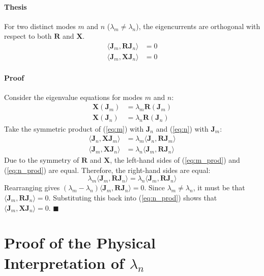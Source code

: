 \documentclass{article}
\begin{document}
\paragraph{Thesis} For two distinct modes $m$ and $n$ ($\lambda_m \neq \lambda_n$), the eigencurrents are orthogonal with respect to both $\mathbf{R}$ and $\mathbf{X}$. 
\begin{align}
    \langle \mathbf{J}_m, \mathbf{R}\mathbf{J}_n \rangle &= 0 \\
    \langle \mathbf{J}_m, \mathbf{X}\mathbf{J}_n \rangle &= 0
\end{align}
\paragraph{Proof}
Consider the eigenvalue equations for modes $m$ and $n$:
\begin{align}
    \mathbf{X}(\mathbf{J}_m) &= \lambda_m \mathbf{R}(\mathbf{J}_m) \label{eq:m} \\
    \mathbf{X}(\mathbf{J}_n) &= \lambda_n \mathbf{R}(\mathbf{J}_n) \label{eq:n}
\end{align}
Take the symmetric product of (\ref{eq:m}) with $\mathbf{J}_n$ and (\ref{eq:n}) with $\mathbf{J}_m$:
\begin{align}
    \langle \mathbf{J}_n, \mathbf{X}\mathbf{J}_m \rangle &= \lambda_m \langle \mathbf{J}_n, \mathbf{R}\mathbf{J}_m \rangle \label{eq:m_prod} \\
    \langle \mathbf{J}_m, \mathbf{X}\mathbf{J}_n \rangle &= \lambda_n \langle \mathbf{J}_m, \mathbf{R}\mathbf{J}_n \rangle \label{eq:n_prod}
\end{align}
Due to the symmetry of $\mathbf{R}$ and $\mathbf{X}$, the left-hand sides of (\ref{eq:m_prod}) and (\ref{eq:n_prod}) are equal. Therefore, the right-hand sides are equal:
\begin{equation}
    \lambda_m \langle \mathbf{J}_m, \mathbf{R}\mathbf{J}_n \rangle = \lambda_n \langle \mathbf{J}_m, \mathbf{R}\mathbf{J}_n \rangle
\end{equation}
Rearranging gives $(\lambda_m - \lambda_n) \langle \mathbf{J}_m, \mathbf{R}\mathbf{J}_n \rangle = 0$. Since $\lambda_m \neq \lambda_n$, it must be that $\langle \mathbf{J}_m, \mathbf{R}\mathbf{J}_n \rangle = 0$. Substituting this back into (\ref{eq:n_prod}) shows that $\langle \mathbf{J}_m, \mathbf{X}\mathbf{J}_n \rangle = 0$. $\blacksquare$

\section{Proof of the Physical Interpretation of $\lambda_n$}
\end{document}
